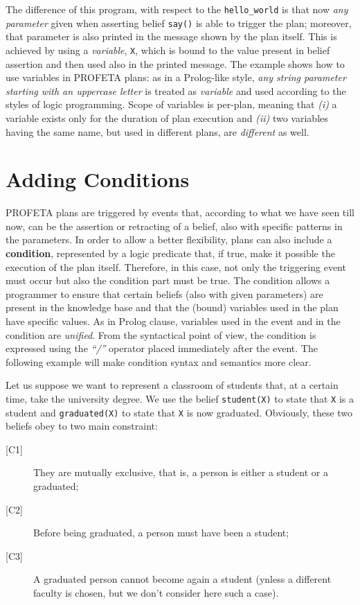 The difference of this program, with respect to the \texttt{hello\_world}
is that now \emph{any parameter} given when asserting belief \texttt{say()}
is able to trigger the plan; moreover, that parameter is also printed in the
message shown by the plan itself.
This is achieved by using a \emph{variable}, \texttt{X}, which is
bound to the value present in belief assertion and then used also in the
printed message.
The example shows how to use variables in PROFETA plans: as in a
Prolog-like style, \emph{any string parameter starting with an uppercase letter}
is treated as \emph{variable} and used according to the styles of logic
programming.
Scope of variables is per-plan, meaning that \emph{(i)} a variable exists
only for the
duration of plan execution and  \emph{(ii)}  two variables having the same
name, but used in different plans, are \emph{different} as well.


\section{Adding Conditions}
PROFETA plans are triggered by events that, according to what we have seen
till now, can be the assertion or retracting of a belief, also with specific
patterns in the parameters.
In order to allow a better flexibility, plans can also include a
\textbf{condition}, represented by a logic predicate that, if true, make it
possible the execution of the plan itself.
Therefore, in this case, not only the triggering event must
occur but also the condition part must be true.
The condition allows a programmer to ensure that certain
beliefs  (also with given parameters) are present in the knowledge base and
that the (bound) variables used in the plan have specific values.
As in Prolog clause, variables used in the event and in the condition are
\emph{unified}.
From the syntactical point of view, the condition is expressed using the
\emph{``/''} operator placed immediately after the event.
The following example will make condition syntax and semantics more clear.

Let us suppose we want to represent a classroom of students that, at a
certain time, take the university degree.
We use the belief \texttt{student(X)} to state that \texttt{X} is a student
and  \texttt{graduated(X)} to state that \texttt{X} is now graduated.
Obviously, these two beliefs obey to two main constraint:
\begin{description}
\item[{[C1]}] They are mutually exclusive, that is, a person is either a student or
  a graduated;
\item[{[C2]}] Before being graduated, a person must have been a student;
\item[{[C3]}] A graduated person cannot become again a student (ynless a
  different faculty is chosen, but we don't consider here such a case).
\end{description}

